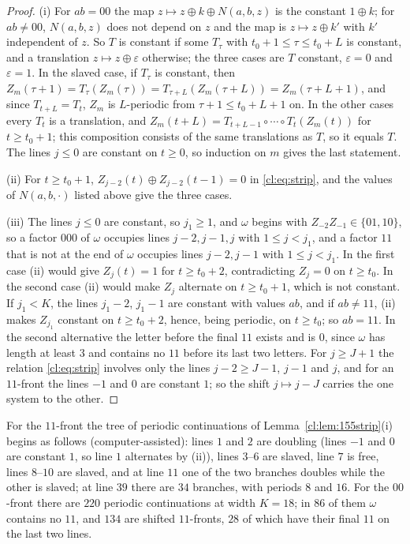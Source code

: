 \begin{proof}
(i) For $ab=00$ the map $z\mapsto z\oplus k\oplus N(a,b,z)$ is the constant $1\oplus k$; for $ab\ne00$, $N(a,b,z)$ does not depend on $z$ and the map is $z\mapsto z\oplus k'$ with $k'$ independent of $z$. So $T$ is constant if some $T_\tau$ with $t_0+1\le\tau\le t_0+L$ is constant, and a translation $z\mapsto z\oplus\varepsilon$ otherwise; the three cases are $T$ constant, $\varepsilon=0$ and $\varepsilon=1$. In the slaved case, if $T_\tau$ is constant, then $Z_m(\tau+1)=T_\tau(Z_m(\tau))=T_{\tau+L}(Z_m(\tau+L))=Z_m(\tau+L+1)$, and since $T_{t+L}=T_t$, $Z_m$ is $L$-periodic from $\tau+1\le t_0+L+1$ on. In the other cases every $T_t$ is a translation, and $Z_m(t+L)=T_{t+L-1}\circ\cdots\circ T_t(Z_m(t))$ for $t\ge t_0+1$; this composition consists of the same translations as $T$, so it equals $T$. The lines $j\le0$ are constant on $t\ge0$, so induction on $m$ gives the last statement.

(ii) For $t\ge t_0+1$, $Z_{j-2}(t)\oplus Z_{j-2}(t-1)=0$ in \eqref{cl:eq:strip}, and the values of $N(a,b,\cdot)$ listed above give the three cases.

(iii) The lines $j\le0$ are constant, so $j_1\ge1$, and $\omega$ begins with $Z_{-2}Z_{-1}\in\{01,10\}$, so a factor $000$ of $\omega$ occupies lines $j-2,j-1,j$ with $1\le j<j_1$, and a factor $11$ that is not at the end of $\omega$ occupies lines $j-2,j-1$ with $1\le j<j_1$. In the first case (ii) would give $Z_j(t)=1$ for $t\ge t_0+2$, contradicting $Z_j=0$ on $t\ge t_0$. In the second case (ii) would make $Z_j$ alternate on $t\ge t_0+1$, which is not constant. If $j_1<K$, the lines $j_1-2$, $j_1-1$ are constant with values $ab$, and if $ab\ne11$, (ii) makes $Z_{j_1}$ constant on $t\ge t_0+2$, hence, being periodic, on $t\ge t_0$; so $ab=11$. In the second alternative the letter before the final $11$ exists and is $0$, since $\omega$ has length at least $3$ and contains no $11$ before its last two letters. For $j\ge J+1$ the relation \eqref{cl:eq:strip} involves only the lines $j-2\ge J-1$, $j-1$ and $j$, and for an $11$-front the lines $-1$ and $0$ are constant $1$; so the shift $j\mapsto j-J$ carries the one system to the other.
\end{proof}

For the $11$-front the tree of periodic continuations of Lemma~\ref{cl:lem:155strip}(i) begins as follows (computer-assisted): lines $1$ and $2$ are doubling (lines $-1$ and $0$ are constant $1$, so line $1$ alternates by (ii)), lines $3$--$6$ are slaved, line $7$ is free, lines $8$--$10$ are slaved, and at line $11$ one of the two branches doubles while the other is slaved; at line $39$ there are $34$ branches, with periods $8$ and $16$. For the $00$-front there are $220$ periodic continuations at width $K=18$; in $86$ of them $\omega$ contains no $11$, and $134$ are shifted $11$-fronts, $28$ of which have their final $11$ on the last two lines.

